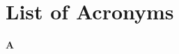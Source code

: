 
\chapter*{List of Acronyms}

\textbf{\newline\newline\Large A} \newline
\begin{acronym_expdlist}
\end{acronym_expdlist}



